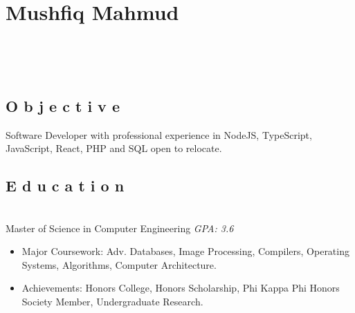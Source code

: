 \documentclass{resume}
\begin{document}
\section{Mushfiq Mahmud}

\begin{center}
	 \hspace{2mm}
	\address{Tampa, FL} \hspace{2mm}
	 \\
	\vspace{1mm}

	 \hspace{1mm}
	 \hspace{1mm}
	 \\
	\vspace{-3mm}
\end{center}


\subsection{O b j e c t i v e}
\small Software Developer with professional experience in NodeJS, TypeScript, JavaScript, React, PHP and SQL open to relocate.


\subsection{E d u c a t i o n}
 \\
Master of Science in Computer Engineering \hfill \emph{GPA: 3.6}

\begin{itemize}
\item \small Major Coursework: Adv. Databases, Image Processing, Compilers, Operating Systems, Algorithms, Computer Architecture.
\item \small Achievements: Honors College, Honors Scholarship, Phi Kappa Phi Honors Society Member, Undergraduate Research.
\end{itemize}

\end{document}
